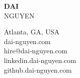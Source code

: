 \documentclass[letterpage]{article}
\begin{document}
\thispagestyle{empty} %
\begin{minipage}[c]{0.4\linewidth}
  \raggedright
  \textbf{\fontsize{37px}{1px}\selectfont\textsf{DAI}}\\
  \vspace{7px}
  {\fontsize{37px}{1px}\selectfont\textsf{NGUYEN}}
\end{minipage}
\begin{minipage}{0.01\linewidth}
\end{minipage}
\:\:\:\:\: %
\begin{minipage}[t]{0.6\linewidth}
  \raggedleft
  \vspace*{-30px}
  Atlanta, GA, USA\enspace\faGlobe\\
  dai-nguyen.com\enspace\faGlobe\\
  hire@dai-nguyen.com\enspace\faPaperPlane\\
  linkedin.dai-nguyen.com\enspace\faLinkedin\\
  github.dai-nguyen.com\enspace\faGithubAlt\\
\end{minipage}
\vspace*{8px}\\ %

\end{document}
